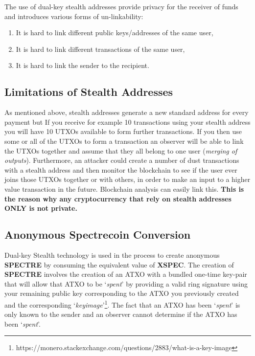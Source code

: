 The use of dual-key stealth addresses provide privacy for the receiver of
funds and introduces various forms of un-linkability: 



\begin{enumerate}
	\item It is hard to	link different public keys/addresses of the same user,
	\item It is hard to	link different transactions of the same user,
	\item It is hard to link the sender to the recipient.
\end{enumerate}



\subsection{Limitations of Stealth Addresses}
As mentioned above, stealth addresses generate a new standard address for
every payment but If you receive for example 10 transactions using your
stealth address you will have 10 UTXOs available to form further
transactions. If you then use some or all of the UTXOs to form a transaction
an observer will be able to link the UTXOs together and assume that they all
belong to one user (\textit{merging of outputs}). Furthermore, an attacker could
create a number of dust transactions with a stealth address and then monitor
the blockchain to see if the user ever joins those UTXOs together or with
others, in order to make an input to a higher value transaction in the future.
Blockchain analysis can easily link this. \textbf{This is the reason why any
cryptocurrency that rely on stealth addresses ONLY is not private.}



\subsection{Anonymous Spectrecoin Conversion}
Dual-key Stealth technology is used in the process to create anonymous 
\textbf{SPECTRE} by consuming the equivalent value of \textbf{XSPEC}. The 
creation of \textbf{SPECTRE} involves the creation of an ATXO with a 
bundled one-time key-pair that will allow that ATXO to be ‘\textit{spent}’ 
by providing a valid ring signature using your remaining public key 
corresponding to the ATXO you previously created and the corresponding 
‘\textit{keyimage}’\footnote{https://monero.stackexchange.com/questions/2883/what-is-a-key-image}. 
The fact that an ATXO has been ‘\textit{spent}’ is only known to the sender 
and an observer cannot determine if the ATXO has been ‘\textit{spent}’.



